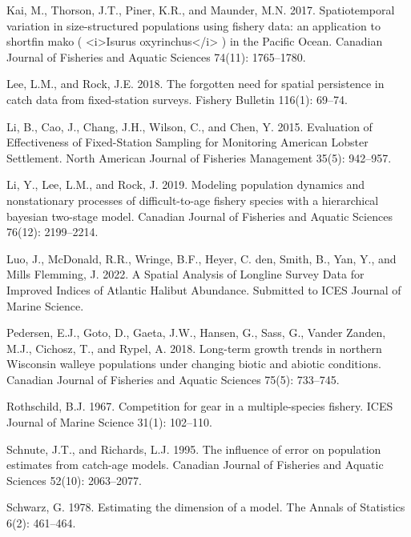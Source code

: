 \documentclass[12pt]{article}\usepackage[]{graphicx}\usepackage[]{color}
\begin{document}
\leavevmode\hypertarget{ref-Kai2017}{}%
Kai, M., Thorson, J.T., Piner, K.R., and Maunder, M.N. 2017. Spatiotemporal variation in size-structured populations using fishery data: an application to shortfin mako ( \textless i\textgreater Isurus oxyrinchus\textless/i\textgreater{} ) in the Pacific Ocean. Canadian Journal of Fisheries and Aquatic Sciences 74(11): 1765--1780.

\leavevmode\hypertarget{ref-Lee2018}{}%
Lee, L.M., and Rock, J.E. 2018. The forgotten need for spatial persistence in catch data from fixed-station surveys. Fishery Bulletin 116(1): 69--74.

\leavevmode\hypertarget{ref-Li2015}{}%
Li, B., Cao, J., Chang, J.H., Wilson, C., and Chen, Y. 2015. Evaluation of Effectiveness of Fixed-Station Sampling for Monitoring American Lobster Settlement. North American Journal of Fisheries Management 35(5): 942--957.

\leavevmode\hypertarget{ref-Li2019}{}%
Li, Y., Lee, L.M., and Rock, J. 2019. Modeling population dynamics and nonstationary processes of difficult-to-age fishery species with a hierarchical bayesian two-stage model. Canadian Journal of Fisheries and Aquatic Sciences 76(12): 2199--2214.

\leavevmode\hypertarget{ref-Luo2022}{}%
Luo, J., McDonald, R.R., Wringe, B.F., Heyer, C. den, Smith, B., Yan, Y., and Mills Flemming, J. 2022. A Spatial Analysis of Longline Survey Data for Improved Indices of Atlantic Halibut Abundance. Submitted to ICES Journal of Marine Science.

\leavevmode\hypertarget{ref-Pedersen2018}{}%
Pedersen, E.J., Goto, D., Gaeta, J.W., Hansen, G., Sass, G., Vander Zanden, M.J., Cichosz, T., and Rypel, A. 2018. Long-term growth trends in northern Wisconsin walleye populations under changing biotic and abiotic conditions. Canadian Journal of Fisheries and Aquatic Sciences 75(5): 733--745.

\leavevmode\hypertarget{ref-Rothschild1967}{}%
Rothschild, B.J. 1967. Competition for gear in a multiple-species fishery. ICES Journal of Marine Science 31(1): 102--110.

\leavevmode\hypertarget{ref-Schnute1995}{}%
Schnute, J.T., and Richards, L.J. 1995. The influence of error on population estimates from catch-age models. Canadian Journal of Fisheries and Aquatic Sciences 52(10): 2063--2077.

\leavevmode\hypertarget{ref-Schwarz1978}{}%
Schwarz, G. 1978. Estimating the dimension of a model. The Annals of Statistics 6(2): 461--464.
\end{document}
